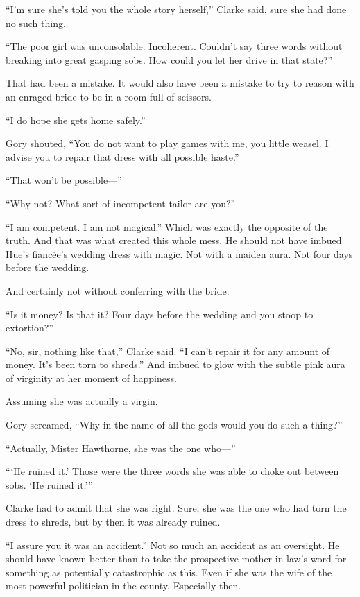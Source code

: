 “I’m sure she’s told you the whole story herself,” Clarke said, sure she
had done no such thing.

“The poor girl was unconsolable. Incoherent. Couldn’t say three words
without breaking into great gasping sobs. How could you let her drive in
that state?”

That had been a mistake. It would also have been a mistake to try to
reason with an enraged bride-to-be in a room full of scissors.

“I do hope she gets home safely.”

Gory shouted, “You do not want to play games with me, you little weasel.
I advise you to repair that dress with all possible haste.”

“That won’t be possible—”

“Why not? What sort of incompetent tailor are you?”

“I am competent. I am not magical.” Which was exactly the opposite of
the truth. And that was what created this whole mess. He should not have
imbued Hue’s fiancée’s wedding dress with magic. Not with a maiden aura.
Not four days before the wedding.

And certainly not without conferring with the bride.

“Is it money? Is that it? Four days before the wedding and you stoop to
extortion?”

“No, sir, nothing like that,” Clarke said. “I can’t repair it for any
amount of money. It’s been torn to shreds.” And imbued to glow with the
subtle pink aura of virginity at her moment of happiness.

Assuming she was actually a virgin.

Gory screamed, “Why in the name of all the gods would you do such a
thing?”

“Actually, Mister Hawthorne, she was the one who—”

“‘He ruined it.’ Those were the three words she was able to choke out
between sobs. ‘He ruined it.’”

Clarke had to admit that she was right. Sure, she was the one who had
torn the dress to shreds, but by then it was already ruined.

“I assure you it was an accident.” Not so much an accident as an
oversight. He should have known better than to take the prospective
mother-in-law’s word for something as potentially catastrophic as this.
Even if she was the wife of the most powerful politician in the county.
Especially then.

